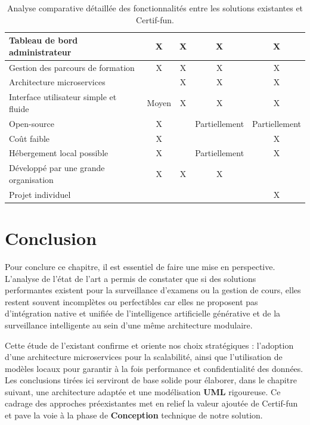 \begin{table}[H]
{\begin{tabular}{|l|c|c|c|c|}
Tableau de bord administrateur & X & X & X & X \\ \hline
Gestion des parcours de formation & X & X & X & X \\ \hline
Architecture microservices & & X & X & X \\ \hline
Interface utilisateur simple et fluide & Moyen & X & X & X \\ \hline
Open-source & X & & Partiellement & Partiellement \\ \hline
Coût faible & X & & & X \\ \hline
Hébergement local possible & X & & Partiellement & X \\ \hline
Développé par une grande organisation & X & X & X & \\ \hline
Projet individuel & & & & X \\ \hline
\end{tabular}%
}
\caption{Analyse comparative détaillée des fonctionnalités entre les solutions existantes et Certif-fun.}
\label{table:comparaison_detaillee}
\end{table}

\section{Conclusion}
Pour conclure ce chapitre, il est essentiel de faire une mise en perspective. L'analyse de l'état de l'art a permis de constater que si des solutions performantes existent pour la surveillance d'examens ou la gestion de cours, elles restent souvent incomplètes ou perfectibles car elles ne proposent pas d'intégration native et unifiée de l'intelligence artificielle générative et de la surveillance intelligente au sein d'une même architecture modulaire.

Cette étude de l'existant confirme et oriente nos choix stratégiques : l'adoption d'une architecture microservices pour la scalabilité, ainsi que l'utilisation de modèles locaux pour garantir à la fois performance et confidentialité des données. Les conclusions tirées ici serviront de base solide pour élaborer, dans le chapitre suivant, une architecture adaptée et une modélisation \textbf{UML} rigoureuse. Ce cadrage des approches préexistantes met en relief la valeur ajoutée de Certif-fun et pave la voie à la phase de \textbf{Conception} technique de notre solution.
